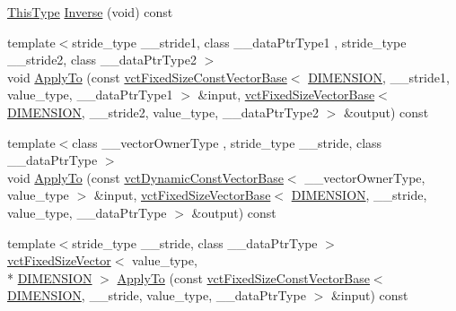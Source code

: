 \begin{DoxyCompactItemize}
\item 
\hyperlink{classvct_quaternion_base_af28efdc38acf89acb7a67afada11408c}{This\-Type} \hyperlink{classvct_quaternion_rotation3_base_af658926043f0deab6997881cd9fff822}{Inverse} (void) const 
\item 
{\footnotesize template$<$stride\-\_\-type \-\_\-\-\_\-stride1, class \-\_\-\-\_\-data\-Ptr\-Type1 , stride\-\_\-type \-\_\-\-\_\-stride2, class \-\_\-\-\_\-data\-Ptr\-Type2 $>$ }\\void \hyperlink{classvct_quaternion_rotation3_base_abd3b8ecd60488880c6dbeb7b614589ec}{Apply\-To} (const \hyperlink{classvct_fixed_size_const_vector_base}{vct\-Fixed\-Size\-Const\-Vector\-Base}$<$ \hyperlink{classvct_quaternion_rotation3_base_a729ac03acdd5949ecf382629e563d2a0a9417132a8a6849e18439d903ae6a1f18}{D\-I\-M\-E\-N\-S\-I\-O\-N}, \-\_\-\-\_\-stride1, value\-\_\-type, \-\_\-\-\_\-data\-Ptr\-Type1 $>$ \&input, \hyperlink{classvct_fixed_size_vector_base}{vct\-Fixed\-Size\-Vector\-Base}$<$ \hyperlink{classvct_quaternion_rotation3_base_a729ac03acdd5949ecf382629e563d2a0a9417132a8a6849e18439d903ae6a1f18}{D\-I\-M\-E\-N\-S\-I\-O\-N}, \-\_\-\-\_\-stride2, value\-\_\-type, \-\_\-\-\_\-data\-Ptr\-Type2 $>$ \&output) const 
\item 
{\footnotesize template$<$class \-\_\-\-\_\-vector\-Owner\-Type , stride\-\_\-type \-\_\-\-\_\-stride, class \-\_\-\-\_\-data\-Ptr\-Type $>$ }\\void \hyperlink{classvct_quaternion_rotation3_base_a2f9afc18f09f6b2d614121fbd65f16ae}{Apply\-To} (const \hyperlink{classvct_dynamic_const_vector_base}{vct\-Dynamic\-Const\-Vector\-Base}$<$ \-\_\-\-\_\-vector\-Owner\-Type, value\-\_\-type $>$ \&input, \hyperlink{classvct_fixed_size_vector_base}{vct\-Fixed\-Size\-Vector\-Base}$<$ \hyperlink{classvct_quaternion_rotation3_base_a729ac03acdd5949ecf382629e563d2a0a9417132a8a6849e18439d903ae6a1f18}{D\-I\-M\-E\-N\-S\-I\-O\-N}, \-\_\-\-\_\-stride, value\-\_\-type, \-\_\-\-\_\-data\-Ptr\-Type $>$ \&output) const 
\item 
{\footnotesize template$<$stride\-\_\-type \-\_\-\-\_\-stride, class \-\_\-\-\_\-data\-Ptr\-Type $>$ }\\\hyperlink{classvct_fixed_size_vector}{vct\-Fixed\-Size\-Vector}$<$ value\-\_\-type, \\*
\hyperlink{classvct_quaternion_rotation3_base_a729ac03acdd5949ecf382629e563d2a0a9417132a8a6849e18439d903ae6a1f18}{D\-I\-M\-E\-N\-S\-I\-O\-N} $>$ \hyperlink{classvct_quaternion_rotation3_base_ae06cb9fb49e622bcfdf2e374a393cddd}{Apply\-To} (const \hyperlink{classvct_fixed_size_const_vector_base}{vct\-Fixed\-Size\-Const\-Vector\-Base}$<$ \hyperlink{classvct_quaternion_rotation3_base_a729ac03acdd5949ecf382629e563d2a0a9417132a8a6849e18439d903ae6a1f18}{D\-I\-M\-E\-N\-S\-I\-O\-N}, \-\_\-\-\_\-stride, value\-\_\-type, \-\_\-\-\_\-data\-Ptr\-Type $>$ \&input) const 

\end{DoxyCompactItemize}
